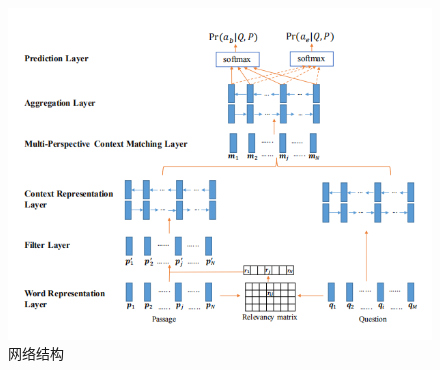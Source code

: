 \documentclass[a4paper,UTF8]{article}
\numberwithin{equation}{section}
\begin{document}
\begin{figure}[H]
    \centering
    \includegraphics[width=\textwidth]{10_1.png}
    \caption{网络结构}
\end{figure}
\newpage
\end{document}
